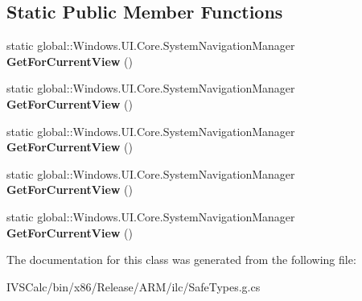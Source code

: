 \subsection*{Static Public Member Functions}
\begin{DoxyCompactItemize}
\item 
\mbox{\label{class_windows_1_1_u_i_1_1_core_1_1_system_navigation_manager_a13ba3eb7da77df27e3c7f73d0de86b3d}} 
static global\+::\+Windows.\+U\+I.\+Core.\+System\+Navigation\+Manager {\bfseries Get\+For\+Current\+View} ()
\item 
\mbox{\label{class_windows_1_1_u_i_1_1_core_1_1_system_navigation_manager_a13ba3eb7da77df27e3c7f73d0de86b3d}} 
static global\+::\+Windows.\+U\+I.\+Core.\+System\+Navigation\+Manager {\bfseries Get\+For\+Current\+View} ()
\item 
\mbox{\label{class_windows_1_1_u_i_1_1_core_1_1_system_navigation_manager_a13ba3eb7da77df27e3c7f73d0de86b3d}} 
static global\+::\+Windows.\+U\+I.\+Core.\+System\+Navigation\+Manager {\bfseries Get\+For\+Current\+View} ()
\item 
\mbox{\label{class_windows_1_1_u_i_1_1_core_1_1_system_navigation_manager_a13ba3eb7da77df27e3c7f73d0de86b3d}} 
static global\+::\+Windows.\+U\+I.\+Core.\+System\+Navigation\+Manager {\bfseries Get\+For\+Current\+View} ()
\item 
\mbox{\label{class_windows_1_1_u_i_1_1_core_1_1_system_navigation_manager_a13ba3eb7da77df27e3c7f73d0de86b3d}} 
static global\+::\+Windows.\+U\+I.\+Core.\+System\+Navigation\+Manager {\bfseries Get\+For\+Current\+View} ()
\end{DoxyCompactItemize}


The documentation for this class was generated from the following file\+:\begin{DoxyCompactItemize}
\item 
I\+V\+S\+Calc/bin/x86/\+Release/\+A\+R\+M/ilc/Safe\+Types.\+g.\+cs\end{DoxyCompactItemize}
